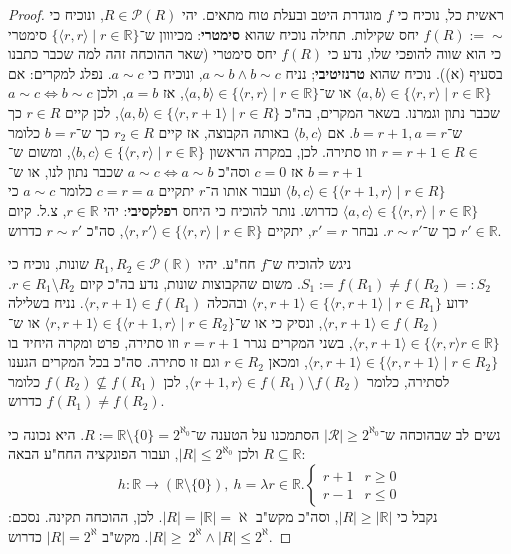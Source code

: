 \documentclass[]{article}
\newcommand\R     {\mathbb{R}}
\newcommand\ps    {\mathcal{P}}
\newcommand\rca   {\mathcal{R}} %
\newcommand\ra    {\rangle}
\newcommand\la    {\langle}
\newcommand\rc    {\right\rceil}
\newcommand\al    {\aleph}
\newcommand\taz   {2^{\aleph_0}}
\newcommand\tal   {2^{\aleph}}
\begin{document}
\begin{enumerate}[(a)]
\begin{proof}
			ראשית כל, נוכיח כי $ f $ מוגדרת היטב ובעלת טוח מתאים. יהי $ R \in \ps(R) $, ונוכיח כי $ f(R) := \sim $ יחס שקילות. תחילה נוכיח שהוא \textbf{סימטרי}: מכיווון ש־$ \{\la r , r \ra \mid r \in \R\} $ סימטרי כי הוא שווה להופכי שלו, נדע כי $ f(R) $ יחס סימטרי (שאר ההוכחה זהה למה שכבר כתבנו בסעיף (א)). נוכיח שהוא \textbf{טרנזיטיבי}; נניח $ a \sim b \land b \sim c $, ונוכיח כי $ a \sim c $. נפלג למקרים: אם $ \la a, b \ra \in \{\la r, r \ra \mid r \in \R\} $ או ש־$ \la a, b \ra \in \{\la r, r \ra \mid r \in \R\} $, אז $ a = b $, ולכן $ a \sim c \iff b \sim c $ שכבר נתון וגמרנו. בשאר המקרים, בה"כ $ \la a, b \ra \in \{\la r, r + 1 \ra \mid r \in R\} $, לכן קיים $ r \in R $ כך ש־$ b = r + 1, a = r $. אם $ \la b, c \ra $ באותה הקבוצה, אז קיים $ r_2 \in R $ כך ש־$ b = r $ כלומר $ r = r + 1 \in R \in $ וזו סתירה. לכן, במקרה הראשון $ \la b, c \ra \in \{\la r, r \ra \mid r \in \R\} $, ומשום ש־$ b = r + 1 $ אז $ c = 0 $ וסה"כ $ a \sim c \iff a \sim b $ שכבר נתון לנו, או ש־$ \la b, c \ra \in \{\la r + 1, r \ra \mid r \in R\} $ ועבור אותו ה־$ r $ יתקיים $ c = r = a $ כלומר $ a \sim c $ כי $ \la a, c \ra \in \{\la r, r \ra \mid r \in \R\} $ כדרוש. נותר להוכיח כי היחס \textbf{רפלקסיבי}: יהי $ r \in \R $, צ.ל. קיום $ r' \in \R $ כך ש־$ r \sim r' $. נבחר $ r' = r $, יתקיים $ \la r, r' \ra \in \{\la r, r \ra \mid r \in \R\} $, סה"כ $ r \sim r' $ כדרוש. 
			
			ניגש להוכיח ש־$ f $ חח"ע. יהיו $ R_1, R_2 \in \ps(\R) $ שונות, נוכיח כי $ S_1 := f(R_1) \neq f(R_2) =: S_2 $. משום שהקבוצות שונות, נדע בה"כ קיום $ r \in R_1 \setminus R_2 $. ידוע $ \la r, r + 1 \ra \in \{\la r, r + 1 \ra \mid r \in R_1\} $ ובהכלה $ \la r, r + 1 \ra \in f(R_1) $. נניח בשלילה $ \la r, r + 1 \ra \in f(R_2) $, ונסיק כי או ש־$ \la r, r + 1 \ra \in \{\la r + 1, r \ra \mid r \in R_2\} $ או ש־$ \la r, r + 1 \ra \in \{\la r, r \ra r \in \R\} $, בשני המקרים נגרר $ r = r + 1 $ וזו סתירה, פרט ומקרה היחיד בו $ \la r, r + 1 \ra \in \{\la r, r + 1 \ra \mid r \in R_2\} $, ומכאן $ r \in R_2 $ וגם זו סתירה. סה"כ בכל המקרים הגענו לסתירה, כלומר $ \la r + 1, r \ra \in f(R_1) \setminus f(R_2) $, לכן $ f(R_2) \nsubseteq f(R_1) $ כלומר $ f(R_1) \neq f(R_2) $ כדרוש. 
			
			נשים לב שבהוכחה ש־$ |\rca| \ge \taz $ הסתמכנו על הטענה ש־$ R := \R \setminus \{0\} = \taz $. היא נכונה כי $ R \subseteq \R $ ולכן $ |R| \le \taz $, ועבור הפונקציה החח"ע הבאה: 
			\[ h \colon \R \to (\R \setminus \{0\}), \ h = \lambda r \in \R. \begin{cases}
				r + 1 & r \ge 0 \\
				r - 1 & r \le 0
			\end{cases} \]
			נקבל כי $ |R| \ge |\R| $, וסה"כ מקש"ב $ |R| = |\R| = \al $. לכן, ההוכחה תקינה. נסכם: $ |R| \ge\ \tal \land |R| \le \tal $. מקש"ב $ |R| = \tal $ כדרוש. 
		\end{proof}
	\end{enumerate}
\end{document}

